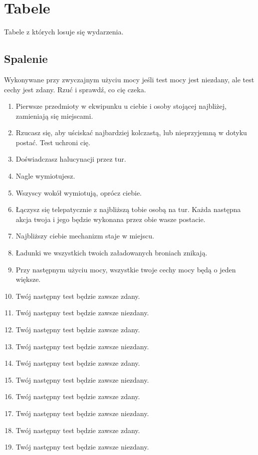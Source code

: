 \chapter{Tabele}
Tabele z których losuje się wydarzenia.

\section{Spalenie}
Wykonywane przy zwyczajnym użyciu mocy jeśli test mocy jest niezdany, ale test cechy jest zdany.
Rzuć \dc{} i sprawdź, co cię czeka.

\begin{enumerate}
	\item Pierwsze przedmioty w ekwipunku u ciebie i osoby stojącej najbliżej, zamieniają się miejscami.
	\item Rzucasz się, aby uściskać najbardziej kolczastą, lub nieprzyjemną w dotyku postać. Test \abh{} uchroni cię.
	\item Doświadczasz halucynacji przez \dvi{} tur.
	\item Nagle wymiotujesz.
	\item Wszyscy wokół wymiotują, oprócz ciebie.
	\item Łączysz się telepatycznie z najbliższą tobie osobą na \dvi{} tur. Każda następna akcja twoja i jego będzie wykonana przez obie wasze postacie.
	\item Najbliższy ciebie mechanizm staje w miejscu.
	\item Ładunki we wszystkich twoich załadowanych broniach znikają.
	\item Przy następnym użyciu mocy, wszystkie twoje cechy mocy będą o jeden większe.
	\item Twój następny test \abi{} będzie zawsze zdany.
	\item Twój następny test \abi{} będzie zawsze niezdany.
	\item Twój następny test \abs{} będzie zawsze zdany.
	\item Twój następny test \abs{} będzie zawsze niezdany.
	\item Twój następny test \abp{} będzie zawsze zdany.
	\item Twój następny test \abp{} będzie zawsze niezdany.
	\item Twój następny test \aba{} będzie zawsze zdany.
	\item Twój następny test \aba{} będzie zawsze niezdany.
	\item Twój następny test \abh{} będzie zawsze zdany.
	\item Twój następny test \abh{} będzie zawsze niezdany.

\end{enumerate}
